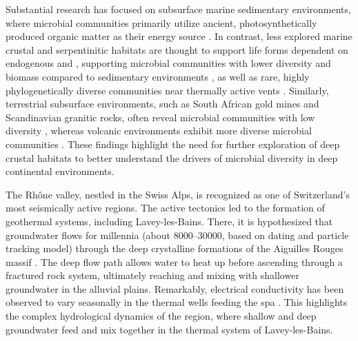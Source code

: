 Substantial research has focused on subsurface marine sedimentary environments, where microbial communities primarily utilize ancient, photosynthetically produced organic matter as their energy source \citep{biddle2006heterotrophic, hondt2015presence, bradley2019survival}.
In contrast, less explored marine crustal and serpentinitic habitats are thought to support life forms dependent on endogenous  and , supporting microbial communities with lower diversity and biomass compared to sedimentary environments \citep{lever2013evidence, fruh2018magmatism, templeton2021accessing}, as well as rare, highly phylogenetically diverse communities near thermally active vents \citep{sogin2006microbial}.
Similarly, terrestrial subsurface environments, such as South African gold mines and Scandinavian granitic rocks, often reveal microbial communities with low diversity \citep{bomberg2015active, itavaara2011characterization, magnabosco2016metagenomic}, whereas volcanic environments exhibit more diverse microbial communities \citep{schilling2023revisiting, kato2009deep}.
These findings highlight the need for further exploration of deep crustal habitats to better understand the drivers of microbial diversity in deep continental environments.

The Rhône valley, nestled in the Swiss Alps, is recognized as one of Switzerland's most seismically active regions. 
The active tectonics led to the formation of geothermal systems, including Lavey-les-Bains. 
There, it is hypothesized that groundwater flows for millennia (about \SIrange{8000}{30000}{\year}, based on  dating and particle tracking model) through the deep crystalline formations of the Aiguilles Rouges massif  \citep{bianchetti1994hydrogeologie, sonney2009numerical}.
The deep flow path allows water to heat up before ascending through a fractured rock system, ultimately reaching and mixing with shallower groundwater in the alluvial plains.
Remarkably, electrical conductivity has been observed to vary seasonally in the thermal wells feeding the spa \citep{sonney2009numerical}. 
This highlights the complex hydrological dynamics of the region, where shallow and deep groundwater feed and mix together in the thermal system of Lavey-les-Bains.

